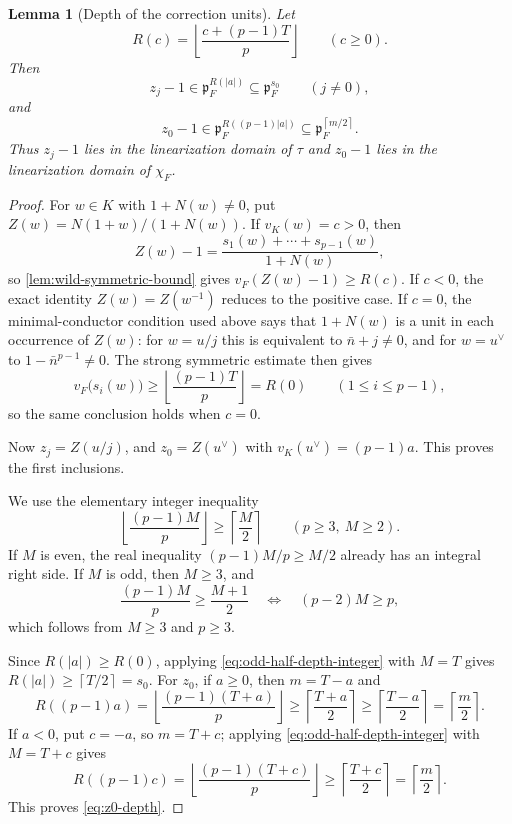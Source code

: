 \documentclass[11pt]{amsart}
\newtheorem{lemma}[theorem]{Lemma}
\theoremstyle{definition}
\theoremstyle{remark}
\newcommand{\p}{\mathfrak p}
\newcommand{\ceil}[1]{\left\lceil #1\right\rceil}
\newcommand{\floor}[1]{\left\lfloor #1\right\rfloor}
\begin{document}
\begin{lemma}[Depth of the correction units]\label{lem:correction-depth}
Let
\[
 R(c)=\floor{\frac{c+(p-1)T}{p}}\qquad(c\ge0).
\]
Then
\begin{equation}\label{eq:zj-depth}
 z_j-1\in\p_F^{R(|a|)}\subseteq\p_F^{s_0}
 \qquad(j\ne0),
\end{equation}
and
\begin{equation}\label{eq:z0-depth}
 z_0-1\in\p_F^{R((p-1)|a|)}
 \subseteq\p_F^{\ceil{m/2}}.
\end{equation}
Thus $z_j-1$ lies in the linearization domain of $\tau$ and
$z_0-1$ lies in the linearization domain of $\chi_F$.
\end{lemma}

\begin{proof}
For $w\in K$ with $1+N(w)\ne0$, put
$Z(w)=N(1+w)/(1+N(w))$.  If $v_K(w)=c>0$, then
\[
 Z(w)-1=\frac{s_1(w)+\cdots+s_{p-1}(w)}{1+N(w)},
\]
so \cref{lem:wild-symmetric-bound} gives
$v_F(Z(w)-1)\ge R(c)$.  If $c<0$, the exact identity
$Z(w)=Z(w^{-1})$ reduces to the positive case.  If $c=0$, the
minimal-conductor condition used above says that $1+N(w)$ is a unit in
each occurrence of $Z(w)$: for $w=u/j$ this is equivalent to
$\bar n+j\ne0$, and for $w=u^\vee$ to $1-\bar n^{p-1}\ne0$.
The strong symmetric estimate then gives
\[
 v_F\bigl(s_i(w)\bigr)\ge
 \floor{\frac{(p-1)T}{p}}=R(0)
 \qquad(1\le i\le p-1),
\]
so the same conclusion holds when $c=0$.

Now $z_j=Z(u/j)$, and $z_0=Z(u^\vee)$ with
$v_K(u^\vee)=(p-1)a$.  This proves the first inclusions.

We use the elementary integer inequality
\begin{equation}\label{eq:odd-half-depth-integer}
 \floor{\frac{(p-1)M}{p}}\ge\ceil{\frac M2}
 \qquad(p\ge3,\ M\ge2).
\end{equation}
If $M$ is even, the real inequality
$(p-1)M/p\ge M/2$ already has an integral right side.  If $M$ is odd,
then $M\ge3$, and
\[
 \frac{(p-1)M}{p}\ge\frac{M+1}{2}
 \quad\Longleftrightarrow\quad
 (p-2)M\ge p,
\]
which follows from $M\ge3$ and $p\ge3$.

Since $R(|a|)\ge R(0)$, applying
\eqref{eq:odd-half-depth-integer} with $M=T$ gives
$R(|a|)\ge\ceil{T/2}=s_0$.  For $z_0$, if $a\ge0$, then
$m=T-a$ and
\[
 R((p-1)a)
 =\floor{\frac{(p-1)(T+a)}p}
 \ge\ceil{\frac{T+a}{2}}
 \ge\ceil{\frac{T-a}{2}}
 =\ceil{\frac m2}.
\]
If $a<0$, put $c=-a$, so $m=T+c$; applying
\eqref{eq:odd-half-depth-integer} with $M=T+c$ gives
\[
 R((p-1)c)
 =\floor{\frac{(p-1)(T+c)}p}
 \ge\ceil{\frac{T+c}{2}}
 =\ceil{\frac m2}.
\]
This proves \eqref{eq:z0-depth}.
\end{proof}
\end{document}
